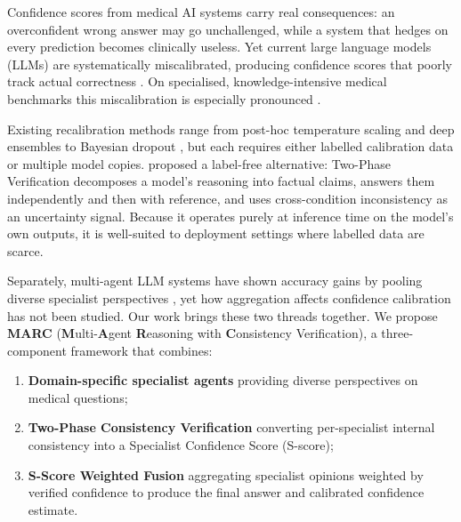 \documentclass[10pt]{article}
\begin{document}
Confidence scores from medical AI systems carry real consequences: an
overconfident wrong answer may go unchallenged, while a system that hedges on
every prediction becomes clinically useless.  Yet current large language models
(LLMs) are systematically miscalibrated, producing confidence scores that
poorly track actual correctness \citep{guo2017calibration, kadavath2022language}.
On specialised, knowledge-intensive medical benchmarks this miscalibration is
especially pronounced \citep{pal2022medmcqa, jin2021disease}.

Existing recalibration methods range from post-hoc temperature scaling
\citep{guo2017calibration} and deep ensembles \citep{lakshminarayanan2017simple}
to Bayesian dropout \citep{gal2016uncertainty}, but each requires either
labelled calibration data or multiple model copies.  \citet{wu2024uncertainty}
proposed a label-free alternative: Two-Phase Verification decomposes a model's
reasoning into factual claims, answers them independently and then with
reference, and uses cross-condition inconsistency as an uncertainty signal.
Because it operates purely at inference time on the model's own outputs, it
is well-suited to deployment settings where labelled data are scarce.

Separately, multi-agent LLM systems have shown accuracy gains by pooling
diverse specialist perspectives \citep{wang2024mixture, li2024camel}, yet
how aggregation affects confidence calibration has not been studied.
Our work brings these two threads together.  We propose \textbf{MARC}
(\textbf{M}ulti-\textbf{A}gent \textbf{R}easoning with \textbf{C}onsistency
Verification), a three-component framework that combines:
\begin{enumerate}
    \item \textbf{Domain-specific specialist agents} providing diverse
          perspectives on medical questions;
    \item \textbf{Two-Phase Consistency Verification} \citep{wu2024uncertainty}
          converting per-specialist internal consistency into a Specialist
          Confidence Score (S-score);
    \item \textbf{S-Score Weighted Fusion} aggregating specialist opinions
          weighted by verified confidence to produce the final answer and
          calibrated confidence estimate.
\end{enumerate}
\end{document}
